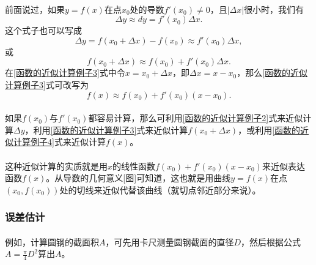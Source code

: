 \paragraph{}
前面说过，如果$y = f(x)$在点$x_0$处的导数$f'(x_0) \neq 0$，且$|\Delta x|$很小时，我们有
\begin{equation}
  \label{函数的近似计算例子1}
  \Delta y \approx dy = f'(x_0)\Delta x.
\end{equation}
这个式子也可以写成
\begin{equation}
  \label{函数的近似计算例子2}
  \Delta y = f(x_0 + \Delta x) - f(x_0) \approx f'(x_0)\Delta x,
\end{equation}
或
\begin{equation}
  \label{函数的近似计算例子3}
  f(x_0 + \Delta x) \approx f(x_0) + f'(x_0)\Delta x.
\end{equation}
在\eqref{函数的近似计算例子3}式中令$x = x_0 + \Delta x$，即$\Delta x = x - x_0$，那么\eqref{函数的近似计算例子3}式可改写为
\begin{equation}
  \label{函数的近似计算例子4}
  f(x) \approx f(x_0) + f'(x_0)(x-x_0).
\end{equation}

\paragraph{}
如果$f(x_0)$与$f'(x_0)$都容易计算，那么可利用\eqref{函数的近似计算例子2}式来近似计算$\Delta y$，利用\eqref{函数的近似计算例子3}式来近似计算$f(x_0 + \Delta x)$，或利用\eqref{函数的近似计算例子4}式来近似计算$f(x)$。

\paragraph{}
这种近似计算的实质就是用$x$的线性函数$f(x_0) + f'(x_0)(x-x_0)$来近似表达函数$f(x)$。从导数的几何意义[图]可知道，这也就是用曲线$y=f(x)$在点$(x_0, f(x_0))$处的切线来近似代替该曲线（就切点邻近部分来说）。

\subsubsection{误差估计}
\paragraph{}
例如，计算圆钢的截面积$A$，可先用卡尺测量圆钢截面的直径$D$，然后根据公式$A = \frac{\pi}{4}D^2$算出$A$。

